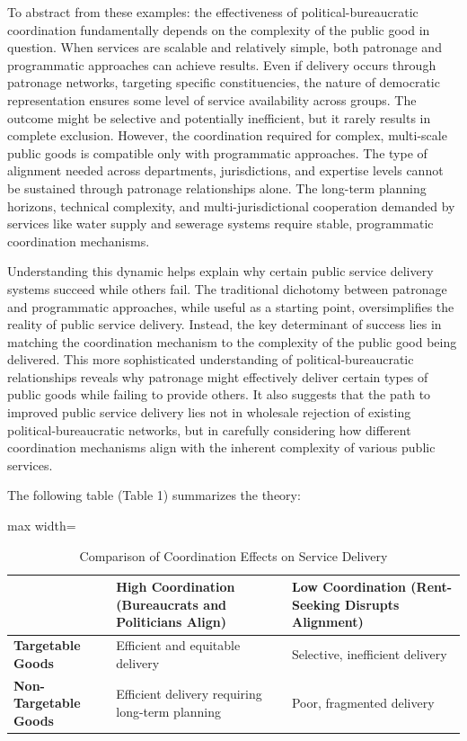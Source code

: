 To abstract from these examples:  the effectiveness of political-bureaucratic coordination fundamentally depends on the complexity of the public good in question. When services are scalable and relatively simple, both patronage and programmatic approaches can achieve results. Even if delivery occurs through patronage networks, targeting specific constituencies, the nature of democratic representation ensures some level of service availability across groups. The outcome might be selective and potentially inefficient, but it rarely results in complete exclusion. However, the coordination required for complex, multi-scale public goods is compatible only with programmatic approaches. The type of alignment needed across departments, jurisdictions, and expertise levels cannot be sustained through patronage relationships alone. The long-term planning horizons, technical complexity, and multi-jurisdictional cooperation demanded by services like water supply and sewerage systems require stable, programmatic coordination mechanisms.

Understanding this dynamic helps explain why certain public service delivery systems succeed while others fail. The traditional dichotomy between patronage and programmatic approaches, while useful as a starting point, oversimplifies the reality of public service delivery. Instead, the key determinant of success lies in matching the coordination mechanism to the complexity of the public good being delivered. This more sophisticated understanding of political-bureaucratic relationships reveals why patronage might effectively deliver certain types of public goods while failing to provide others. It also suggests that the path to improved public service delivery lies not in wholesale rejection of existing political-bureaucratic networks, but in carefully considering how different coordination mechanisms align with the inherent complexity of various public services. 

The following table (Table 1) summarizes the theory: 
\vspace{5pt}

\setlength{\extrarowheight}{1pt}  %
\setlength{\tabcolsep}{6pt}  %

\begin{table}[ht]
\centering
\footnotesize  %
\caption{Comparison of Coordination Effects on Service Delivery}  %
\begin{adjustbox}{max width=\textwidth}
\begin{tabularx}{\textwidth}{|p{3cm}|X|X|}
\hline
 & \textbf{High Coordination (Bureaucrats and Politicians Align)} & \textbf{Low Coordination (Rent-Seeking Disrupts Alignment)} \\
\hline
\textbf{Targetable Goods} & Efficient and equitable delivery & Selective, inefficient delivery \\
\hline
\textbf{Non-Targetable Goods} & Efficient delivery requiring long-term planning & Poor, fragmented delivery \\
\hline
\end{tabularx}
\end{adjustbox}
\end{table}

